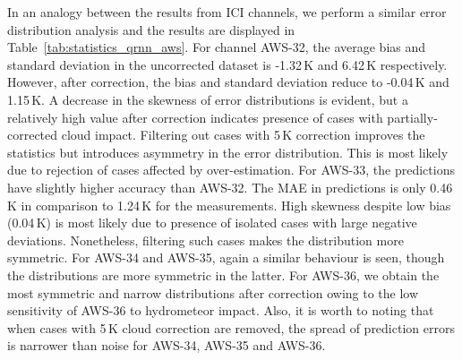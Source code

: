 \documentclass[amt, manuscript]{copernicus}
\begin{document}
In an analogy between the results from ICI channels, we perform a similar error distribution analysis  and the results are displayed in Table~\ref{tab:statistics_qrnn_aws}. For channel AWS-32, the average bias and standard deviation in the uncorrected dataset is -1.32\,K and 6.42\,K respectively. However, after correction, the bias and standard deviation reduce to -0.04\,K and 1.15\,K. A decrease in the skewness of error distributions is evident, but a relatively high value after correction indicates presence of cases with partially-corrected cloud impact. Filtering out cases with 5\,K correction improves the statistics but introduces asymmetry in the error distribution. This is most likely due to rejection of cases affected by over-estimation. For AWS-33, the predictions have slightly higher accuracy than AWS-32. The MAE in predictions is only 0.46\,K in comparison to 1.24\,K for the measurements. High skewness despite low bias (0.04\,K) is most likely due to presence of isolated cases with large negative deviations. Nonetheless, filtering such cases makes the distribution more symmetric. For AWS-34 and AWS-35, again a similar behaviour is seen, though the distributions are more symmetric in the latter. For AWS-36, we obtain the most symmetric and narrow distributions after correction owing to the low sensitivity of AWS-36 to hydrometeor impact.  Also, it is worth to noting that when cases with 5\,K cloud correction are removed, the spread of prediction errors is narrower than noise for AWS-34, AWS-35 and AWS-36. 
\end{document}
